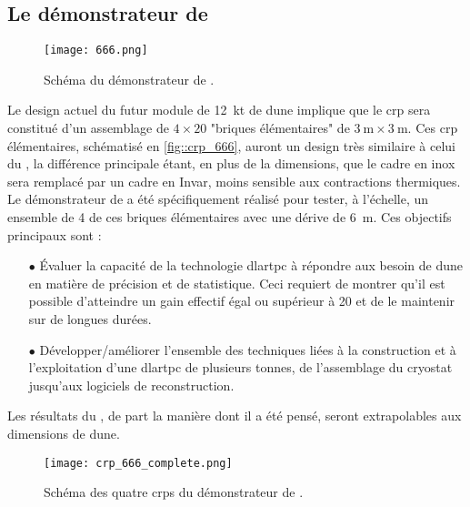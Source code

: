     \subsection{Le démonstrateur de \SSS{}}

      \begin{figure}[htbp]
        \begin{center}\texttt{[image: 666.png]}\end{center}
        \caption[Schéma du démonstrateur de \SSS{}.]{\label{fig::666}Schéma du démonstrateur de \SSS{}.}
      \end{figure}

      Le design actuel du futur module de \SI{12}{\kilo\tonne}\cite{Acciarri2016a} de \gls{dune} implique que le \gls{crp} sera constitué d'un assemblage de $4\times20$ "briques élémentaires" de $\SI{3}{\meter}\times\SI{3}{\meter}$. Ces \gls{crp} élémentaires, schématisé en \autoref{fig::crp_666}, auront un design très similaire à celui du \TOO{}, la différence principale étant, en plus de la dimensions, que le cadre en inox sera remplacé par un cadre en Invar, moins sensible aux contractions thermiques. Le démonstrateur de \SSS{} a été spécifiquement réalisé pour tester, à l'échelle, un ensemble de 4 de ces briques élémentaires avec une dérive de \SI{6}{\meter}. Ces objectifs principaux sont :
      \begin{itemize}
        \item[$\bullet$] Évaluer la capacité de la technologie \gls{dlartpc} à répondre aux besoin de \gls{dune} en matière de précision et de statistique. Ceci requiert de montrer qu'il est possible d'atteindre un gain effectif égal ou supérieur à 20 et de le maintenir sur de longues durées.
        \item[$\bullet$] Développer/améliorer l'ensemble des techniques liées à la construction et à l'exploitation d'une \gls{dlartpc} de plusieurs tonnes, de l'assemblage du cryostat jusqu'aux logiciels de reconstruction.
      \end{itemize}
      Les résultats du \SSS{}, de part la manière dont il a été pensé, seront extrapolables aux dimensions de \gls{dune}.

      \begin{figure}[htbp]
        \begin{center}\texttt{[image: crp\_666\_complete.png]}\end{center}
        \caption[Schéma des CRPs du \SSS{}.]{\label{fig::crp_666}Schéma des quatre \glspl{crp} du démonstrateur de \SSS{}.}
      \end{figure}

